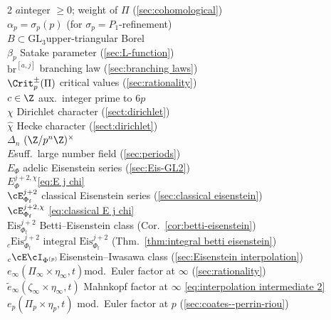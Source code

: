 \documentclass[10pt,reqno,a4paper]{amsart}
\newcommand{\Phif}{{\Phi\subf}}
\newcommand{\chihat}{\widehat{\chi}}
\newcommand{\subf}{_{\mathrm{f}}}
\newcommand{\GL}{\mathrm{GL}}
\begin{document}
\footnotesize \hspace{1pt}
\begin{multicols}{2}
	\noindent $a$\dotfill integer $\geq 0$; weight of $\Pi$ (\cref{sec:cohomological})\\
	$\alpha_p = \sigma_p(p)$ \dotfill (for $\sigma_p = P_1$-refinement)\\
	$B \subset \GL_3$\dotfill upper-triangular Borel\\
	$\beta_p$  \dotfill Satake parameter (\cref{sec:L-function})\\
	$\mathrm{br}^{[a,j]}$ \dotfill branching law (\cref{sec:branching laws})\\
	$\Crit_p^\pm(\Pi)$ \dotfill critical values (\cref{sec:rationality})\\
	$c \in \Z$ \dotfill aux.\ integer prime to $6p$\\
	$\chi$ \dotfill Dirichlet character (\cref{sect:dirichlet})\\
	$\chihat$ \dotfill Hecke character (\cref{sect:dirichlet})\\
	$\Delta_n$ \dotfill $(\Z/p^n\Z)^\times$\\
	$E$\dotfill suff.\ large number field (\cref{sec:periods})\\
	$E_\Phi$ \dotfill adelic Eisenstein series (\cref{sec:Eis-GL2})\\
	$E_\Phi^{j+2,\chi}$\dotfill \eqref{eq:E j chi}\\
	$\cE_{\Phif}^{j+2}$ \dotfill classical Eisenstein series (\cref{sec:classical eisenstein})\\
	$\cE_{\Phif}^{j+2,\chi}$ \dotfill \eqref{eq:classical E j chi}\\
	$\mathrm{Eis}_{\Phif}^{j+2}$ \dotfill Betti--Eisenstein class (Cor.\ \ref{cor:betti-eisenstein})\\
	${}_c\mathrm{Eis}_{\Phif}^{j+2}$ \dotfill integral $\mathrm{Eis}_{\Phif}^{j+2}$ (Thm.\ \ref{thm:integral betti eisenstein})\\
	${}_c \cE\cI_{\Phi^{(p)}}$\dotfill Eisenstein--Iwasawa class (\cref{sec:Eisenstein interpolation})\\
	$e_\infty(\Pi_\infty \times \eta_\infty,t)$\dotfill mod.\ Euler factor at $\infty$ (\cref{sec:rationality})\\
	$\widetilde{e}_\infty(\zeta_\infty \times \eta_\infty,t)$ \dotfill Mahnkopf factor at $\infty$ \eqref{eq:interpolation intermediate 2}\\
	$e_p(\Pi_p \times \eta_{p}, t)$ \dotfill mod.\ Euler factor at $p$ (\cref{sec:coates--perrin-riou})\\

\end{multicols}
\end{document}
